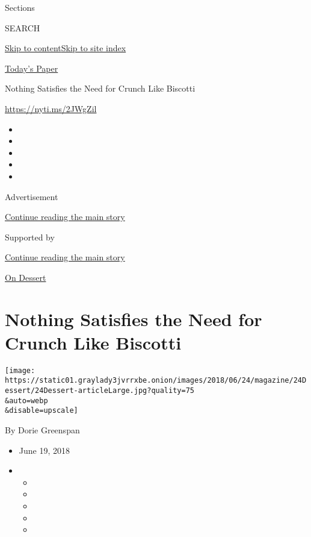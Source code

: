Sections

SEARCH

\protect\hyperlink{site-content}{Skip to
content}\protect\hyperlink{site-index}{Skip to site index}

\href{https://myaccount.nytimes3xbfgragh.onion/auth/login?response_type=cookie\&client_id=vi}{}

\href{https://www.nytimes3xbfgragh.onion/section/todayspaper}{Today's
Paper}

Nothing Satisfies the Need for Crunch Like Biscotti

\url{https://nyti.ms/2JWgZil}

\begin{itemize}
\item
\item
\item
\item
\item
\end{itemize}

Advertisement

\protect\hyperlink{after-top}{Continue reading the main story}

Supported by

\protect\hyperlink{after-sponsor}{Continue reading the main story}

\href{/column/on-dessert}{On Dessert}

\hypertarget{nothing-satisfies-the-need-for-crunch-like-biscotti}{%
\section{Nothing Satisfies the Need for Crunch Like
Biscotti}\label{nothing-satisfies-the-need-for-crunch-like-biscotti}}

\texttt{[image: https://static01.graylady3jvrrxbe.onion/images/2018/06/24/magazine/24Dessert/24Dessert-articleLarge.jpg?quality=75\\\&auto=webp\\\&disable=upscale]}

By Dorie Greenspan

\begin{itemize}
\item
  June 19, 2018
\item
  \begin{itemize}
  \item
  \item
  \item
  \item
  \item
  \end{itemize}
\end{itemize}

